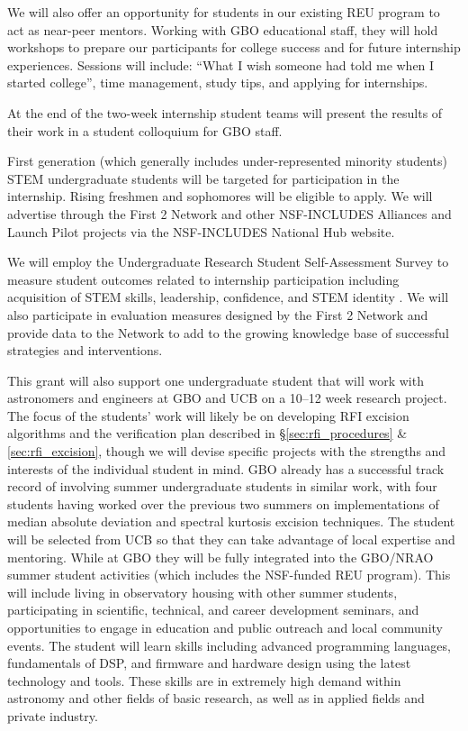 \documentclass[10pt]{myNSF}
\begin{document}
We will also offer an opportunity for students in our existing REU
program to act as near-peer mentors. Working with GBO educational
staff, they will hold workshops to prepare our participants for
college success and for future internship experiences. Sessions will
include: ``What I wish someone had told me when I started college'',
time management, study tips, and applying for internships.

At the end of the two-week internship student teams will present the
results of their work in a student colloquium for GBO staff.

 First generation
(which generally includes under-represented minority students) STEM
undergraduate students will be targeted for participation in the
internship. Rising freshmen and sophomores will be eligible to apply.
We will advertise through the First 2 Network and other NSF-INCLUDES
Alliances and Launch Pilot projects via the NSF-INCLUDES National Hub
website.

 We will employ the Undergraduate Research
Student Self-Assessment Survey to measure student outcomes related to
internship participation including acquisition of STEM skills,
leadership, confidence, and STEM identity \cite{wld15}. We will also
participate in evaluation measures designed by the First 2 Network and
provide data to the Network to add to the growing knowledge base of
successful strategies and interventions.

\label{sec:summer_student}

This grant will also support one undergraduate student that will work
with astronomers and engineers at GBO and UCB on a 10--12 week
research project.  The focus of the students' work will likely be on
developing RFI excision algorithms and the verification plan described
in \S\ref{sec:rfi_procedures} \& \ref{sec:rfi_excision}, though we
will devise specific projects with the strengths and interests of the
individual student in mind.  GBO already has a successful track record
of involving summer undergraduate students in similar work, with four
students having worked over the previous two summers on
implementations of median absolute deviation and spectral kurtosis
excision techniques.  The student will be selected from UCB so that
they can take advantage of local expertise and mentoring.  While at
GBO they will be fully integrated into the GBO/NRAO summer student
activities (which includes the NSF-funded REU program).  This will
include living in observatory housing with other summer students,
participating in scientific, technical, and career development
seminars, and opportunities to engage in education and public outreach
and local community events.  The student will learn skills including
advanced programming languages, fundamentals of DSP, and firmware and
hardware design using the latest technology and tools.  These skills
are in extremely high demand within astronomy and other fields of
basic research, as well as in applied fields and private industry.
\end{document}
